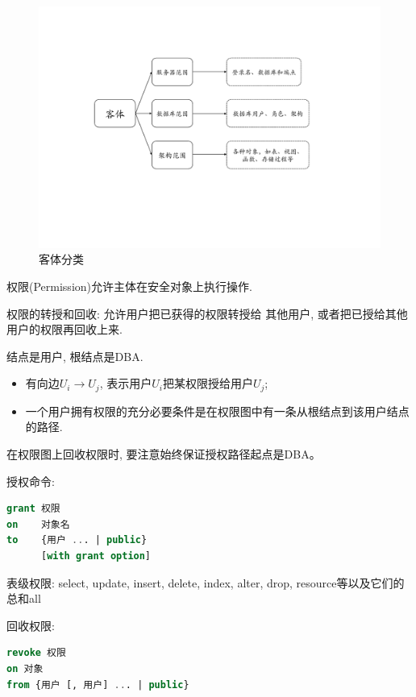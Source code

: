 \begin{figure}[H]
    \centering
    \includegraphics[width=.7\textwidth]{figure/客体.pdf}
    \caption{客体分类}
\end{figure}

\begin{definition}[权限(Permission)]
    权限(Permission)允许主体在安全对象上执行操作.
\end{definition}

\begin{definition}[权限的转授和回收]
    权限的转授和回收: 允许用户把已获得的权限转授给
其他用户, 或者把已授给其他用户的权限再回收上来.
\end{definition}

\begin{definition}[权限图]
    结点是用户, 根结点是DBA.
    \begin{itemize}
        \item 有向边$U_i\to U_j$, 表示用户$U_i$把某权限授给用户$U_j$;
        \item 一个用户拥有权限的充分必要条件是在权限图中有一条从根结点到该用户结点的路径.
    \end{itemize}
\end{definition}

在权限图上回收权限时, 要注意始终保证授权路径起点是DBA。

授权命令:
\begin{lstlisting}[language=SQL]
grant 权限
on    对象名
to    {用户 ... | public}
      [with grant option]
\end{lstlisting}

表级权限: select, update, insert, delete, index, alter, drop, resource等以及它们的总和all

回收权限:
\begin{lstlisting}[language=SQL]
revoke 权限
on 对象
from {用户 [, 用户] ... | public}
\end{lstlisting}

